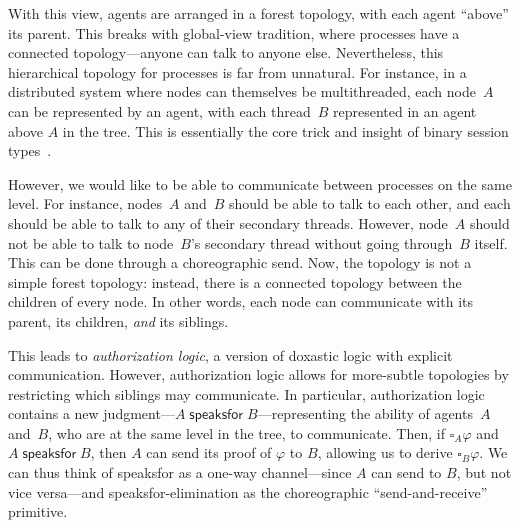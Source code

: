   

With this view, agents are arranged in a forest topology, with each agent ``above'' its parent. %
This breaks with global-view tradition, where processes have a connected topology---anyone can talk to anyone else.
Nevertheless, this hierarchical topology for processes is far from unnatural.
For instance, in a distributed system where nodes can themselves be multithreaded, each node~$A$ can be represented by an agent, with each thread~$B$ represented in an agent above $A$ in the tree.
This is essentially the core trick and insight of binary session types~\cite{Wadler12,DeYoungCPT12,CairesP10,DeYoungCPT09}.

However, we would like to be able to communicate between processes on the same level.
For instance, nodes~$A$ and~$B$ should be able to talk to each other, and each should be able to talk to any of their secondary threads.
However, node~$A$ should not be able to talk to node~$B$'s secondary thread without going through~$B$ itself.
This can be done through a choreographic send.
Now, the topology is not a simple forest topology: instead, there is a connected topology between the children of every node.
In other words, each node can communicate with its parent, its children, \emph{and} its siblings.

This leads to \emph{authorization logic}, a version of doxastic logic with explicit communication.
However, authorization logic allows for more-subtle topologies by restricting which siblings may communicate.
In particular, authorization logic contains a new judgment---$A \mathrel{\textsf{speaksfor}} B$---representing the ability of agents~$A$ and~$B$, who are at the same level in the tree, to communicate.
Then, if $\square_A \varphi$ and $A \mathrel{\textsf{speaksfor}} B$, then $A$ can send its proof of $\varphi$ to $B$, allowing us to derive $\square_B \varphi$.
We can thus think of \textsf{speaksfor} as a one-way channel---since $A$ can send to $B$, but not vice versa---and \textsf{speaksfor}-elimination as the choreographic ``send-and-receive'' primitive.

